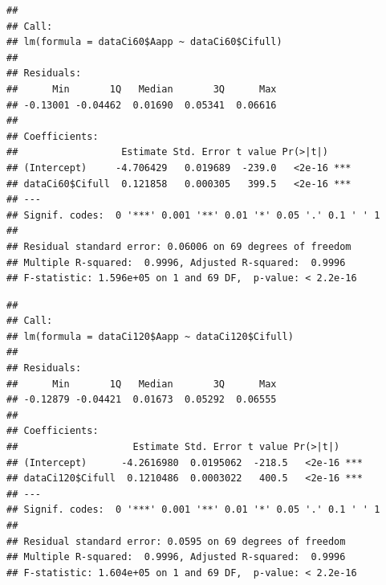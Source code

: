 \documentclass[
]{krantz}
\makeatletter
\newenvironment{Shaded}{\begin{snugshade}}{\end{snugshade}}
\newcommand{\DecValTok}[1]{\textcolor[rgb]{0.00,0.00,0.81}{#1}}
\newcommand{\FunctionTok}[1]{\textcolor[rgb]{0.00,0.00,0.00}{#1}}
\newcommand{\NormalTok}[1]{#1}
\newcommand{\OtherTok}[1]{\textcolor[rgb]{0.56,0.35,0.01}{#1}}
\newcommand{\SpecialCharTok}[1]{\textcolor[rgb]{0.00,0.00,0.00}{#1}}
\newenvironment{kframe}{%
\medskip{}
\setlength{\fboxsep}{.8em}
 \def\at@end@of@kframe{}%
 \ifinner\ifhmode%
  \def\at@end@of@kframe{\end{minipage}}%
  \begin{minipage}{\columnwidth}%
 \fi\fi%
 \def\FrameCommand##1{\hskip\@totalleftmargin \hskip-\fboxsep
 \colorbox{shadecolor}{##1}\hskip-\fboxsep
     \hskip-\linewidth \hskip-\@totalleftmargin \hskip\columnwidth}%
 \MakeFramed {\advance\hsize-\width
   \@totalleftmargin\z@ \linewidth\hsize
   \@setminipage}}%
 {\par\unskip\endMakeFramed%
 \at@end@of@kframe}
\renewenvironment{Shaded}{\begin{kframe}}{\end{kframe}}
\makeatother
\begin{document}
\begin{Shaded}
\end{Shaded}

\begin{verbatim}
## 
## Call:
## lm(formula = dataCi60$Aapp ~ dataCi60$Cifull)
## 
## Residuals:
##      Min       1Q   Median       3Q      Max 
## -0.13001 -0.04462  0.01690  0.05341  0.06616 
## 
## Coefficients:
##                  Estimate Std. Error t value Pr(>|t|)    
## (Intercept)     -4.706429   0.019689  -239.0   <2e-16 ***
## dataCi60$Cifull  0.121858   0.000305   399.5   <2e-16 ***
## ---
## Signif. codes:  0 '***' 0.001 '**' 0.01 '*' 0.05 '.' 0.1 ' ' 1
## 
## Residual standard error: 0.06006 on 69 degrees of freedom
## Multiple R-squared:  0.9996, Adjusted R-squared:  0.9996 
## F-statistic: 1.596e+05 on 1 and 69 DF,  p-value: < 2.2e-16
\end{verbatim}

\begin{Shaded}
\end{Shaded}

\begin{verbatim}
## 
## Call:
## lm(formula = dataCi120$Aapp ~ dataCi120$Cifull)
## 
## Residuals:
##      Min       1Q   Median       3Q      Max 
## -0.12879 -0.04421  0.01673  0.05292  0.06555 
## 
## Coefficients:
##                    Estimate Std. Error t value Pr(>|t|)    
## (Intercept)      -4.2616980  0.0195062  -218.5   <2e-16 ***
## dataCi120$Cifull  0.1210486  0.0003022   400.5   <2e-16 ***
## ---
## Signif. codes:  0 '***' 0.001 '**' 0.01 '*' 0.05 '.' 0.1 ' ' 1
## 
## Residual standard error: 0.0595 on 69 degrees of freedom
## Multiple R-squared:  0.9996, Adjusted R-squared:  0.9996 
## F-statistic: 1.604e+05 on 1 and 69 DF,  p-value: < 2.2e-16
\end{verbatim}
\end{document}
